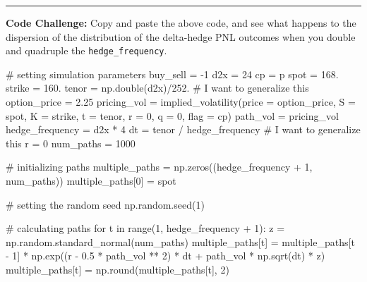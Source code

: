 \documentclass[
  letterpaper,
  DIV=11,
  numbers=noendperiod]{scrreprt}
\newenvironment{Shaded}{\begin{snugshade}}{\end{snugshade}}
\newcommand{\BuiltInTok}[1]{\textcolor[rgb]{0.00,0.23,0.31}{#1}}
\newcommand{\CommentTok}[1]{\textcolor[rgb]{0.37,0.37,0.37}{#1}}
\newcommand{\ControlFlowTok}[1]{\textcolor[rgb]{0.00,0.23,0.31}{#1}}
\newcommand{\DecValTok}[1]{\textcolor[rgb]{0.68,0.00,0.00}{#1}}
\newcommand{\FloatTok}[1]{\textcolor[rgb]{0.68,0.00,0.00}{#1}}
\newcommand{\KeywordTok}[1]{\textcolor[rgb]{0.00,0.23,0.31}{#1}}
\newcommand{\NormalTok}[1]{\textcolor[rgb]{0.00,0.23,0.31}{#1}}
\newcommand{\OperatorTok}[1]{\textcolor[rgb]{0.37,0.37,0.37}{#1}}
\newcommand{\StringTok}[1]{\textcolor[rgb]{0.13,0.47,0.30}{#1}}
\begin{document}
\begin{center}\rule{0.5\linewidth}{0.5pt}\end{center}

\textbf{Code Challenge:} Copy and paste the above code, and see what
happens to the dispersion of the distribution of the delta-hedge PNL
outcomes when you double and quadruple the \texttt{hedge\_frequency}.

\begin{Shaded}
\begin{Highlighting}[]
\CommentTok{\# setting simulation parameters}
\NormalTok{buy\_sell }\OperatorTok{=} \OperatorTok{{-}}\DecValTok{1}
\NormalTok{d2x }\OperatorTok{=} \DecValTok{24}
\NormalTok{cp }\OperatorTok{=} \StringTok{\textquotesingle{}p\textquotesingle{}}
\NormalTok{spot }\OperatorTok{=} \FloatTok{168.}
\NormalTok{strike }\OperatorTok{=} \FloatTok{160.}
\NormalTok{tenor }\OperatorTok{=}\NormalTok{ np.double(d2x)}\OperatorTok{/}\FloatTok{252.} \CommentTok{\# I want to generalize this}
\NormalTok{option\_price }\OperatorTok{=} \FloatTok{2.25}
\NormalTok{pricing\_vol }\OperatorTok{=}\NormalTok{ implied\_volatility(price }\OperatorTok{=}\NormalTok{ option\_price, S }\OperatorTok{=}\NormalTok{ spot, K }\OperatorTok{=}\NormalTok{ strike, t }\OperatorTok{=}\NormalTok{ tenor, r }\OperatorTok{=} \DecValTok{0}\NormalTok{, q }\OperatorTok{=} \DecValTok{0}\NormalTok{, flag }\OperatorTok{=}\NormalTok{ cp)}
\NormalTok{path\_vol }\OperatorTok{=}\NormalTok{ pricing\_vol}
\NormalTok{hedge\_frequency }\OperatorTok{=}\NormalTok{ d2x }\OperatorTok{*} \DecValTok{4}
\NormalTok{dt }\OperatorTok{=}\NormalTok{ tenor }\OperatorTok{/}\NormalTok{ hedge\_frequency  }\CommentTok{\# I want to generalize this}
\NormalTok{r }\OperatorTok{=} \DecValTok{0}
\NormalTok{num\_paths }\OperatorTok{=} \DecValTok{1000}


\CommentTok{\# initializing paths}
\NormalTok{multiple\_paths }\OperatorTok{=}\NormalTok{ np.zeros((hedge\_frequency }\OperatorTok{+} \DecValTok{1}\NormalTok{, num\_paths))}
\NormalTok{multiple\_paths[}\DecValTok{0}\NormalTok{] }\OperatorTok{=}\NormalTok{ spot}

\CommentTok{\# setting the random seed}
\NormalTok{np.random.seed(}\DecValTok{1}\NormalTok{)}

\CommentTok{\# calculating paths}
\ControlFlowTok{for}\NormalTok{ t }\KeywordTok{in} \BuiltInTok{range}\NormalTok{(}\DecValTok{1}\NormalTok{, hedge\_frequency }\OperatorTok{+} \DecValTok{1}\NormalTok{):}
\NormalTok{    z }\OperatorTok{=}\NormalTok{ np.random.standard\_normal(num\_paths) }
\NormalTok{    multiple\_paths[t] }\OperatorTok{=}\NormalTok{ multiple\_paths[t }\OperatorTok{{-}} \DecValTok{1}\NormalTok{] }\OperatorTok{*}\NormalTok{ np.exp((r }\OperatorTok{{-}} \FloatTok{0.5} \OperatorTok{*}\NormalTok{ path\_vol }\OperatorTok{**} \DecValTok{2}\NormalTok{) }\OperatorTok{*}\NormalTok{ dt }\OperatorTok{+}\NormalTok{ path\_vol }\OperatorTok{*}\NormalTok{ np.sqrt(dt) }\OperatorTok{*}\NormalTok{ z)}
\NormalTok{    multiple\_paths[t] }\OperatorTok{=}\NormalTok{ np.}\BuiltInTok{round}\NormalTok{(multiple\_paths[t], }\DecValTok{2}\NormalTok{)}


\end{Highlighting}
\end{Shaded}
\end{document}
